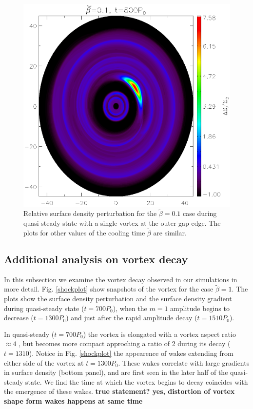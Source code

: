 \begin{figure}
  \includegraphics[width=\linewidth,height=\linewidth]{figures/vortex2D}
  \caption{Relative surface density perturbation for the
    $\tilde\beta=0.1$ case during quasi-steady state with a single
    vortex at the outer gap edge. 
    The plots for other values of the cooling time
    $\tilde{\beta}$ are similar.
    \label{Vortex2D}} 
\end{figure}

\subsection{Additional analysis on vortex decay}
In this subsection we examine the vortex decay observed in our
simulations in more detail. Fig. \ref{shockplot} show snapshots
of the vortex for the case $\tilde{\beta}=1$. The plots show the surface
density perturbation and the surface density gradient during
quasi-steady state ($t=700P_0$), when the $m=1$ amplitude begins to
decrease ($t=1300P_0$) and just after the rapid amplitude decay
($t=1510P_0$). 

In quasi-steady ($t=700P_0$) the vortex is elongated with a vortex aspect ratio $ \approx 4$
, but becomes more compact approching a ratio of 2 during its decay ($t=1310$).   
Notice in Fig. \ref{shockplot} the appearence of wakes extending from
either side of the vortex at $t=1300P_0$. These 
wakes correlate with large gradients in surface density (bottom
panel), and are first seen in the later half of the quasi-steady
state. We find the time at which 
the vortex begins to decay coincides with the emergence of these
wakes. {\bf true statement? yes, distortion of vortex shape form wakes happens at same time}  

